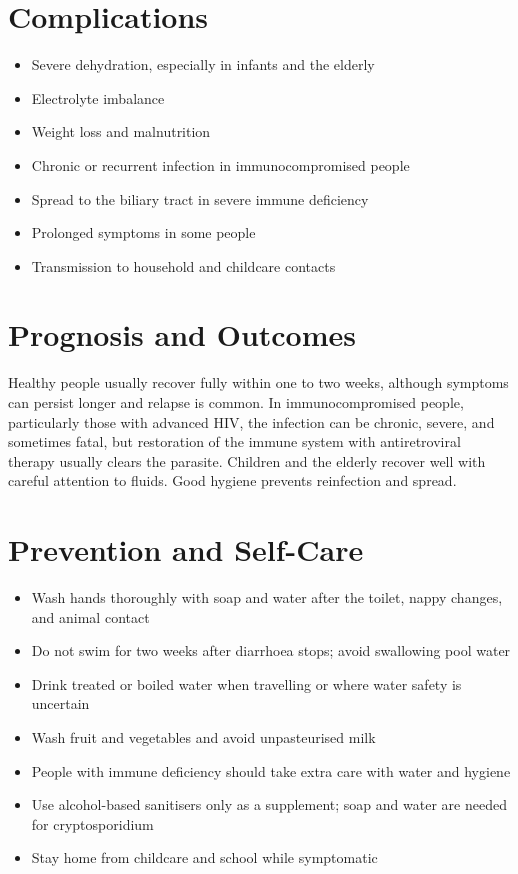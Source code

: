 \section*{Complications}
\begin{itemize}
    \item Severe dehydration, especially in infants and the elderly
    \item Electrolyte imbalance
    \item Weight loss and malnutrition
    \item Chronic or recurrent infection in immunocompromised people
    \item Spread to the biliary tract in severe immune deficiency
    \item Prolonged symptoms in some people
    \item Transmission to household and childcare contacts
\end{itemize}

\section*{Prognosis and Outcomes}
Healthy people usually recover fully within one to two weeks, although symptoms can persist longer and relapse is common. In immunocompromised people, particularly those with advanced HIV, the infection can be chronic, severe, and sometimes fatal, but restoration of the immune system with antiretroviral therapy usually clears the parasite. Children and the elderly recover well with careful attention to fluids. Good hygiene prevents reinfection and spread.

\section*{Prevention and Self-Care}
\begin{itemize}
    \item Wash hands thoroughly with soap and water after the toilet, nappy changes, and animal contact
    \item Do not swim for two weeks after diarrhoea stops; avoid swallowing pool water
    \item Drink treated or boiled water when travelling or where water safety is uncertain
    \item Wash fruit and vegetables and avoid unpasteurised milk
    \item People with immune deficiency should take extra care with water and hygiene
    \item Use alcohol-based sanitisers only as a supplement; soap and water are needed for cryptosporidium
    \item Stay home from childcare and school while symptomatic
\end{itemize}

